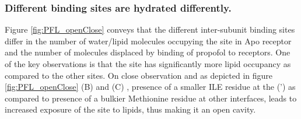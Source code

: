 \documentclass{biophys}
\begin{document}

\subsubsection{Different binding sites are hydrated differently.}
Figure \ref{fig:PFL_openClose} conveys that the different inter-subunit binding sites differ in the number of water/lipid molecules occupying the site in Apo receptor and the number of molecules displaced by binding of propofol to receptors. One of the key observations is that the \ag site has significantly more lipid occupancy as compared to the other sites. On close observation and as depicted in figure \ref{fig:PFL_openClose} (B) and (C) , presence of a smaller ILE residue at the \ag (') as compared to presence of a bulkier Methionine residue at other interfaces, leads to increased exposure of the site to lipids, thus making it an open cavity.

\end{document}
